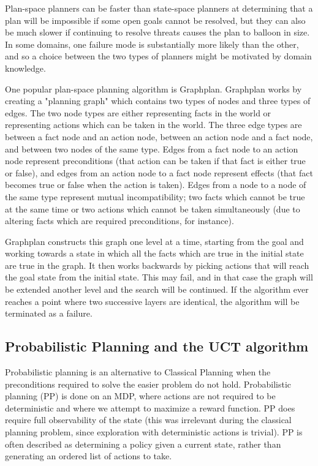 Plan-space planners can be faster than state-space planners at determining that a plan will be
impossible if some open goals cannot be resolved, but they can also be much slower if
continuing to resolve threats causes the plan to balloon in size.  In some domains, one
failure mode is substantially more likely than the other, and so a choice between the
two types of planners might be motivated by domain knowledge.

One popular plan-space planning algorithm is Graphplan\cite{graphplan}.  Graphplan works by creating
a "planning graph" which contains two types of nodes and three types of edges.  The two node types are
either representing facts in the world or representing actions which can be taken in the world.  The three edge
types are between a fact node and an action node, between an action node and a fact node, and between two
nodes of the same type.  Edges from a fact node to an action node represent preconditions (that action can be
taken if that fact is either true or false), and edges from an action node to a fact node represent effects (that
fact becomes true or false when the action is taken).  Edges from a node to a node of the same type represent
mutual incompatibility; two facts which cannot be true at the same time or two actions which cannot be taken
simultaneously (due to altering facts which are required preconditions, for instance).

Graphplan constructs this graph one level at a time, starting from the goal and working towards a state in which
all the facts which are true in the initial state are true in the graph.  It then works backwards by picking actions
that will reach the goal state from the initial state.  This may fail, and in that case the graph will be extended
another level and the search will be continued.  If the algorithm ever reaches a point where two successive
layers are identical, the algorithm will be terminated as a failure.



\subsection{Probabilistic Planning and the UCT algorithm}

Probabilistic planning is an alternative to Classical Planning when the preconditions required to solve the
easier problem do not hold.  Probabilistic planning (PP) is done on an MDP, where actions are not required
to be deterministic and where we attempt to maximize a reward function.  PP does require
full observability of the state (this was irrelevant during the classical planning
problem, since exploration with deterministic actions is trivial).  PP is often described
as determining a policy given a current state, rather than generating an ordered list of actions to take.

